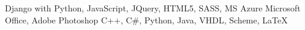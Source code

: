 \vspace{\acvSectionContentTopSkip}
\vspace{\acvSectionContentTopSkip}
\begin{cvskills}
	 {Django with Python, JavaScript, JQuery, HTML5, SASS, MS Azure}
	 {Microsoft Office, Adobe Photoshop}
	 {C++, C\#, Python, Java, VHDL, Scheme, LaTeX}
  \end{cvskills}

